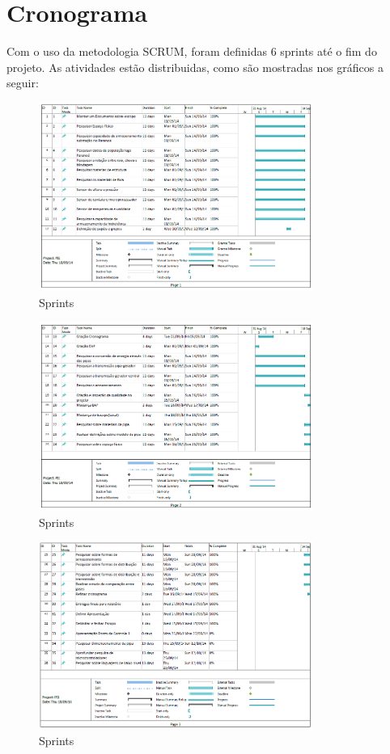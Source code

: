 \chapter*[Cronograma]{Cronograma}

Com o uso da metodologia SCRUM, foram definidas 6 sprints até o fim do projeto. As atividades estão distribuidas, como são mostradas nos gráficos a seguir:


\begin{figure}[p]
	\centering
    \includegraphics[width=0.8\textwidth]{figuras/sprints1.png}
    \caption{Sprints}
    \label{fig:sprints1}
\end{figure} 

\begin{figure}[p]
	\centering
    \includegraphics[width=0.8\textwidth]{figuras/sprints2.png}
    \caption{Sprints}
    \label{fig:sprints2}
\end{figure} 


\begin{figure}[p]
	\centering
    \includegraphics[width=0.8\textwidth]{figuras/sprints3.png}
    \caption{Sprints}
    \label{fig:sprints3}
\end{figure} 